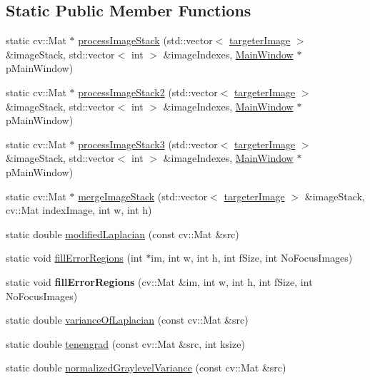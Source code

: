 \subsection*{Static Public Member Functions}
\begin{DoxyCompactItemize}
\item 
static cv\+::\+Mat $\ast$ \hyperlink{class_focus_stack_aca40f92aa05f5aa0a2e58c846bb69a75}{process\+Image\+Stack} (std\+::vector$<$ \hyperlink{classtargeter_image}{targeter\+Image} $>$ \&image\+Stack, std\+::vector$<$ int $>$ \&image\+Indexes, \hyperlink{class_main_window}{Main\+Window} $\ast$p\+Main\+Window)
\item 
static cv\+::\+Mat $\ast$ \hyperlink{class_focus_stack_a6342aff10617c4346b32f61ea549b378}{process\+Image\+Stack2} (std\+::vector$<$ \hyperlink{classtargeter_image}{targeter\+Image} $>$ \&image\+Stack, std\+::vector$<$ int $>$ \&image\+Indexes, \hyperlink{class_main_window}{Main\+Window} $\ast$p\+Main\+Window)
\item 
static cv\+::\+Mat $\ast$ \hyperlink{class_focus_stack_a141b4869671825fed21068a9c9f2c150}{process\+Image\+Stack3} (std\+::vector$<$ \hyperlink{classtargeter_image}{targeter\+Image} $>$ \&image\+Stack, std\+::vector$<$ int $>$ \&image\+Indexes, \hyperlink{class_main_window}{Main\+Window} $\ast$p\+Main\+Window)
\item 
static cv\+::\+Mat $\ast$ \hyperlink{class_focus_stack_ac55d6cde57441ffd9b023fc936529802}{merge\+Image\+Stack} (std\+::vector$<$ \hyperlink{classtargeter_image}{targeter\+Image} $>$ \&image\+Stack, cv\+::\+Mat index\+Image, int w, int h)
\item 
static double \hyperlink{class_focus_stack_a4aaf824aa1df503f99c24e3cf9a40189}{modified\+Laplacian} (const cv\+::\+Mat \&src)
\item 
static void \hyperlink{class_focus_stack_a1ab8c45eab892975ad3dbdf039add315}{fill\+Error\+Regions} (int $\ast$im, int w, int h, int f\+Size, int No\+Focus\+Images)
\item 
\mbox{\label{class_focus_stack_ae47c1a7f8114be3d4b75949516e49002}} 
static void {\bfseries fill\+Error\+Regions} (cv\+::\+Mat \&im, int w, int h, int f\+Size, int No\+Focus\+Images)
\item 
static double \hyperlink{class_focus_stack_afc9e634d57f2b2f0df1d6d615cd44c15}{variance\+Of\+Laplacian} (const cv\+::\+Mat \&src)
\item 
static double \hyperlink{class_focus_stack_a6b65715e671ef5a016d9e216705d687d}{tenengrad} (const cv\+::\+Mat \&src, int ksize)
\item 
static double \hyperlink{class_focus_stack_ad1ceb7d7b721e11b2861332823c0b09d}{normalized\+Graylevel\+Variance} (const cv\+::\+Mat \&src)
\end{DoxyCompactItemize}


